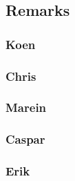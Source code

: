\documentclass[10pt,twocolumn]{scrartcl}
\begin{document}
\subsection{Remarks}
\subsubsection{Koen}
\subsubsection{Chris}
\subsubsection{Marein}
\subsubsection{Caspar}
\subsubsection{Erik}



\end{document}

